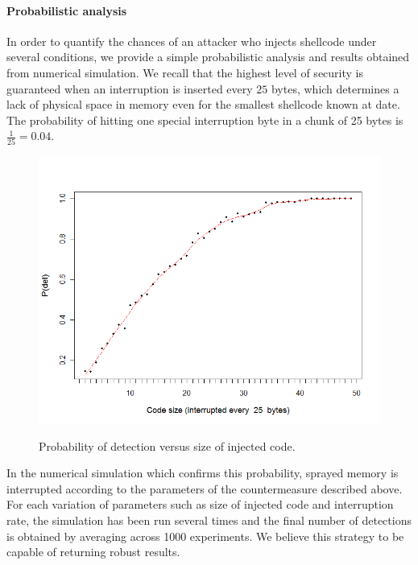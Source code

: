 \paragraph{Probabilistic analysis}
In order to quantify the chances of an attacker who injects shellcode under several conditions, we provide a simple probabilistic analysis and results obtained from numerical simulation.
We recall that the highest level of security is guaranteed when an interruption is inserted every $25$ bytes, which determines a lack of physical space in memory even for the smallest shellcode known at date. 
The probability of hitting one special interruption byte in a chunk of 25 bytes is $\frac{1}{25}=0.04$.
   
\begin{figure}[htbp] 
\begin{center}
\includegraphics[scale=0.5]{images/bubble_det_codesize}
\caption{{Probability of detection versus size of injected code.}}
\vspace{0.3cm}
\label{det_codesize}
\end{center}
\end{figure}


In the numerical simulation which confirms this probability, sprayed memory is interrupted according to the parameters of the countermeasure described above. For each variation of parameters such as size of injected code and interruption rate, the simulation has been run several times and the final number of detections is obtained by averaging across 1000 experiments. We believe this strategy to be capable of returning robust results.

